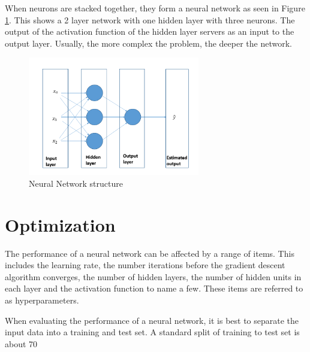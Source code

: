 When neurons are stacked together, they form a neural network as seen in Figure \ref{fig:neuralnetwork}. This shows a 2 layer network with one hidden layer with three neurons. The output of the activation function of the hidden layer servers as an input to the output layer. Usually, the more complex the problem, the deeper the network.


\begin{figure}
\centering
  \includegraphics[width=75mm,scale=0.75]{multi-layer-network.PNG}
  \caption{Neural Network structure}
  \label{fig:neuralnetwork}
\end{figure}

\section{Optimization}
The performance of a neural network can be affected by a range of items. This includes the learning rate, the number iterations before the gradient descent algorithm converges, the number of hidden layers, the number of hidden units in each layer and the activation function to name a few.  
These items are referred to as hyperparameters. 

When evaluating the performance of a neural network, it is best to separate the input data into a training and test set. A standard split of training to test set is about 70%

